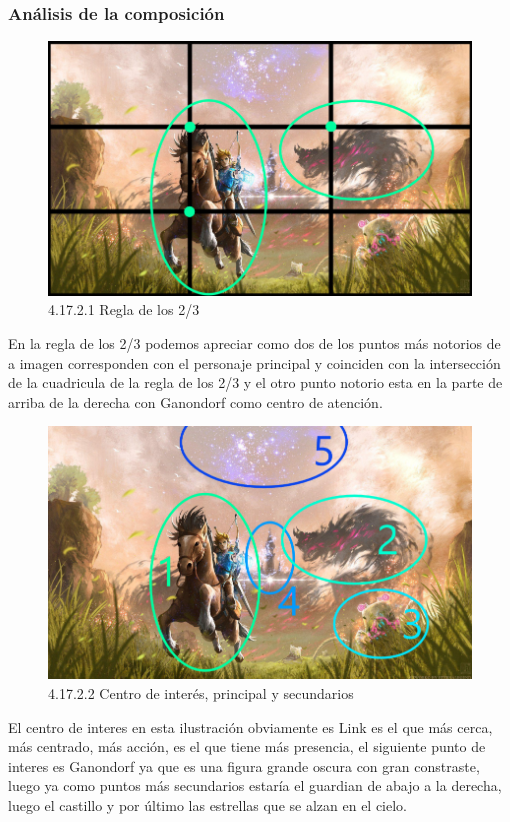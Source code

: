 \documentclass[12pt]{article}
\begin{document}
    \subsubsection{Análisis de la composición}

        
      \begin{figure}[H]
        \centering
        \includegraphics[scale=0.7]{images/Saúl/Sección 17/EA_img17_2Composicion_1Regla2-3.png}
        \caption{\small 4.17.2.1 Regla de los 2/3}
      \end{figure}
      En la regla de los 2/3 podemos apreciar como dos de los puntos más notorios de a imagen corresponden con el personaje principal y coinciden con la intersección de la cuadricula de la regla de los 2/3 y el otro punto notorio esta en la parte de arriba de la derecha con Ganondorf como centro de atención.


      \begin{figure}[H]
        \centering
        \includegraphics[scale=0.7]{images/Saúl/Sección 17/EA_img17_2Composicion_2PuntosInteres.png}
        \caption{\small 4.17.2.2 Centro de interés, principal y secundarios}
      \end{figure}
      El centro de interes en esta ilustración obviamente es Link es el que más cerca, más centrado, más acción, es el que tiene más presencia, el siguiente punto de interes es Ganondorf ya que es una figura grande oscura con gran constraste, luego ya como puntos más secundarios estaría el guardian de abajo a la derecha, luego el castillo y por último las estrellas que se alzan en el cielo.
\end{document}
